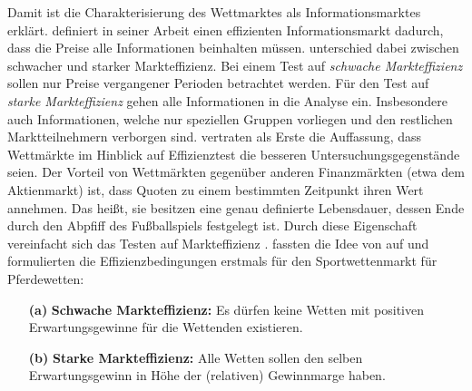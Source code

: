 Damit ist die Charakterisierung des Wettmarktes als Informationsmarktes erklärt. \citet{fama1970efficient} definiert in seiner Arbeit einen effizienten Informationsmarkt dadurch, dass die Preise alle Informationen beinhalten müssen. \citeauthor{fama1970efficient} unterschied dabei zwischen schwacher und starker Markteffizienz. Bei einem Test auf \textit{schwache Markteffizienz} sollen nur Preise vergangener Perioden betrachtet werden. Für den Test auf \textit{starke Markteffizienz} gehen alle Informationen in die Analyse ein. Insbesondere auch Informationen, welche nur speziellen Gruppen vorliegen und den restlichen Marktteilnehmern verborgen sind. \citet{thaler1988parimutuel} vertraten als Erste die Auffassung, dass Wettmärkte im Hinblick auf Effizienztest die besseren Untersuchungsgegenstände seien. Der Vorteil von Wettmärkten gegenüber anderen Finanzmärkten (etwa dem Aktienmarkt) ist, dass Quoten zu einem bestimmten Zeitpunkt ihren Wert annehmen. Das heißt, sie besitzen eine genau definierte Lebensdauer, dessen Ende durch den Abpfiff des Fußballspiels festgelegt ist. Durch diese Eigenschaft vereinfacht sich das Testen auf Markteffizienz \citep[S. 427]{vlastakis2009efficient}. \citet[S. 163]{thaler1988parimutuel} fassten die Idee von \citeauthor{fama1970efficient} auf und formulierten die Effizienzbedingungen erstmals für den Sportwettenmarkt für Pferdewetten:

\begin{definition}
\begin{itemize}
\item[\textbf{(a)}] \textbf{Schwache Markteffizienz:} Es dürfen keine Wetten mit positiven Erwartungsgewinne für die Wettenden existieren.
\item[\textbf{(b)}] \textbf{Starke Markteffizienz:} Alle Wetten sollen den selben Erwartungsgewinn in Höhe der (relativen) Gewinnmarge haben.
\end{itemize}
\label{def_markteffizienz}
\end{definition}


